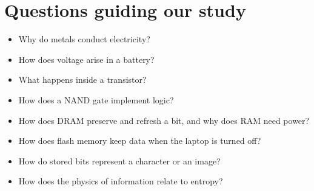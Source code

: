 \section{Questions guiding our study}

\begin{itemize}
\item Why do metals conduct electricity?
\item How does voltage arise in a battery?
\item What happens inside a transistor?
\item How does a NAND gate implement logic?
\item How does DRAM preserve and refresh
a bit, and why does RAM need power?
\item How does flash memory keep data
when the laptop is turned off?
\item How do stored bits represent a
character or an image?
\item How does the physics of information
relate to entropy?
\end{itemize}





